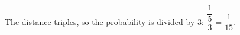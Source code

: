 The distance triples, so the probability is divided by 3: $\dfrac{\dfrac{1}{5}}{3}=\boxed{\dfrac{1}{15}}$.
